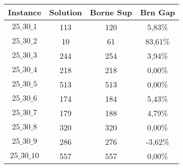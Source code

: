\documentclass[a4paper, 11pt]{article} %
\begin{document}
\begin{center}
\begin{figure}[H]
      \begin{tabular}{|c|c|c|c|}
      \hline 
        Instance & Solution & Borne Sup & Brn Gap  \\ \hline
$25\_30\_1$ & 113 & 120 & 5,83\% \\ \hline
$25\_30\_2$ & 10 &  61 &  83,61\% \\ \hline
$25\_30\_3$ & 244 & 254 & 3,94\% \\ \hline
$25\_30\_4$ & 218 & 218 & 0,00\% \\ \hline
$25\_30\_5$ & 513 & 513 & 0,00\% \\ \hline
$25\_30\_6$ & 174 & 184 & 5,43\% \\ \hline
$25\_30\_7$ & 179 & 188 & 4,79\% \\ \hline
$25\_30\_8$ & 320 & 320 & 0,00\% \\ \hline
$25\_30\_9$ & 286 & 276 & -3,62\% \\ \hline
$25\_30\_10$ & 557 & 557 & 0,00\% \\ \hline
      \end{tabular}
\end{figure}
\end{center}
\end{document}
